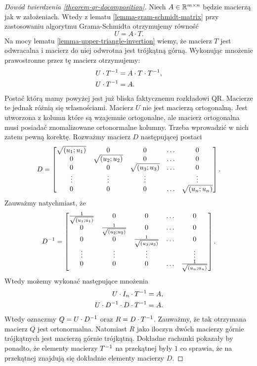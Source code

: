 \documentclass[10pt,a4paper]{report}
\newcommand{\mx}[1]{{#1}}
\begin{document}
\begin{proof}[Dowód twierdzenia \ref{theorem-qr-docomposition}]
Niech $\mx{A} \in \setR^{m \times n}$ będzie macierzą jak w założeniach. Wtedy z lematu \ref{lemma-gram-schmidt-matrix} przy zastosowaniu algorytmu Grama-Schmidta otrzymujemy równość
$$
\mx{U} = \mx{A} \cdot \mx{T}.
$$
Na mocy lematu \ref{lemma-upper-triangle-invertion} wiemy, że macierz $\mx{T}$ jest odwracalna i macierz do niej odwrotna jest trójkątną górną. Wykonując mnożenie prawostronne przez tę macierz otrzymujemy:
\begin{align*}
\mx{U} \cdot \inverse{\mx{T}} & = \mx{A}\cdot\mx{T}\cdot \inverse{\mx{T}}, \\
\mx{U} \cdot \inverse{\mx{T}} & = \mx{A}.
\end{align*}  
Postać którą mamy powyżej jest już bliska faktycznemu rozkładowi QR. Macierze te jednak różnią się własnościami. Macierz $\mx{U}$ nie jest macierzą ortogonalną. Jest utworzona z kolumn które są wzajemnie ortogonalne, ale macierz ortogonalna musi posiadać znomalizowane ortonormalne kolumny. Trzeba wprowadzić w nich zatem pewną korektę. Rozważmy macierz $\mx{D}$ następującej postaci
$$
\mx{D} = \begin{bmatrix}
\sqrt{\scalar{u_1}{u_1}} & 0 & 0 & \ldots & 0 \\
0 & \sqrt{\scalar{u_2}{u_2}} & 0 & \ldots & 0 \\
0 & 0 & \sqrt{\scalar{u_3}{u_3}} & \ldots & 0 \\
\vdots & \vdots & \vdots & & \vdots \\
0 & 0 & 0 & \ldots & \sqrt{\scalar{u_n}{u_n}}
\end{bmatrix}.
$$
Zauważmy natychmiast, że 
$$
\inverse{\mx{D}} = 
\begin{bmatrix}
\frac{1}{\sqrt{\scalar{u_1}{u_1}}} & 0 & 0 & \ldots & 0 \\
0 & \frac{1}{\sqrt{\scalar{u_2}{u_2}}} & 0 & \ldots & 0 \\
0 & 0 & \frac{1}{\sqrt{\scalar{u_3}{u_3}}} & \ldots & 0 \\
\vdots & \vdots & \vdots & & \vdots \\
0 & 0 & 0 & \ldots & \frac{1}{\sqrt{\scalar{u_n}{u_n}}}
\end{bmatrix}.
$$
Wtedy możemy wykonać następujące mnożenia
\begin{align*}
\mx{U} \cdot \mx{I_n} \cdot \inverse{\mx{T}} & = \mx{A} ,\\
\mx{U} \cdot \inverse{\mx{D}} \cdot \mx{D} \cdot \inverse{\mx{T}} & = \mx{A}.
\end{align*}
Wtedy oznaczmy $\mx{Q}= \mx{U} \cdot \inverse{\mx{D}}$ oraz $ \mx{R} = \mx{D}\cdot \inverse{\mx{T}}$. Zauważmy, że tak otrzymana macierz $\mx{Q}$ jest ortonormalna. Natomiast $\mx{R}$ jako iloczyn dwóch macierzy górnie trójkątnych jest macierzą górnie trójkątną. Dokładne rachunki pokazały by ponadto, że elementy macierzy $\inverse{\mx{T}} $ na przekątnej były $1$ co sprawia, że na przekątnej znajdują się dokładnie elementy macierzy $\mx{D}$.

\end{proof}
\end{document}
